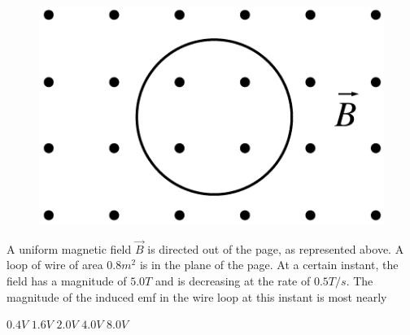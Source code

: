 \begin{figure}[H]
\centering
\includegraphics[scale=0.3]{images/img-010-031.png}
\end{figure}

\begin{questions}\setcounter{question}{18}\question
A uniform magnetic field $\vec{B}$ is directed out of the page, as represented above. A loop of wire of area $0.8 \unit{m^2}$ is in the plane of the page. At a certain instant, the field has a magnitude of $5.0 \unit{T}$ and is decreasing at the rate of $0.5 \unit{T/s}$. The magnitude of the induced emf in the wire loop at this instant is most nearly

\begin{oneparchoices}
\choice $0.4 \unit{V}$
\choice $1.6 \unit{V}$
\choice $2.0 \unit{V}$
\choice $4.0 \unit{V}$
\choice $8.0 \unit{V}$
\end{oneparchoices}\end{questions}

